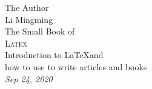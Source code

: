 \begin{titlepage}
  \raggedleft
      {\Large The Author\\ Li Mingming\\[1in] }
  {\large The Small Book of\\}
  {\Huge\scshape Latex\\[.2in]}
  {\large Introduction to \LaTeX and \\ how to use to write articles and books\\}
  \vfill
  {\itshape Sep 24, 2020}
\end{titlepage}


